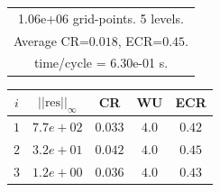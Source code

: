 \begin{table}[hbt]
\begin{center}
{\begin{tabular}{|c|c|c|c|c|}
\multicolumn{5}{|c|}{1.06e+06 grid-points. 5 levels.}  \\
\multicolumn{5}{|c|}{Average CR=$0.018$, ECR=$0.45$.}  \\
\multicolumn{5}{|c|}{time/cycle = 6.30e-01 s.}  \\
\hline 
\end{tabular}
\begin{tabular}{|c|c|c|c|c|} \hline 
 $i$   & $\vert\vert\mbox{res}\vert\vert_\infty$  &  CR     &  WU    & ECR  \\   \hline 
 $ 1$  & $ 7.7e+02$ & $0.033$ & $ 4.0$ & $0.42$ \\ 
 $ 2$  & $ 3.2e+01$ & $0.042$ & $ 4.0$ & $0.45$ \\ 
 $ 3$  & $ 1.2e+00$ & $0.036$ & $ 4.0$ & $0.43$ \\ 

\end{tabular}}
\end{center}
\end{table}
